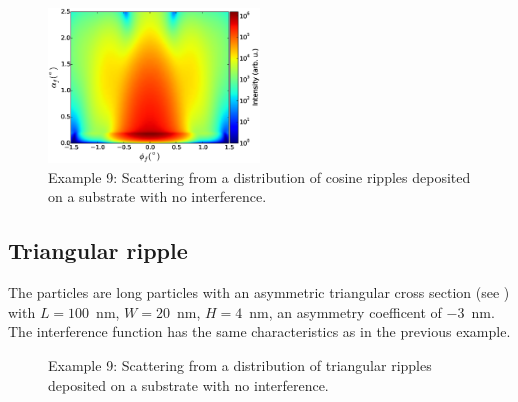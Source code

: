 \begin{figure}[H]
\begin{center}
\includegraphics[width=0.5\textwidth]{Figures/py-ex/figure_ex009CosRippleNoInterf.eps}
\end{center}
\caption{Example 9: Scattering from a distribution of cosine ripples deposited on a substrate with no interference.}
\label{fig:PythonEx9CosRipplenointerf}
\end{figure}

\subsection{Triangular ripple}
 The particles are long particles with an asymmetric triangular cross section (see ) with  $L=100$~nm, $W=20$~nm, $H=4$~nm, an asymmetry coefficent of $-3$~nm. The interference function has the same characteristics as in the previous example.

\begin{figure}[H]
\hfill
{}
\hfill
{}
\hfill
\caption{Example 9: Scattering from a distribution of triangular ripples deposited on a substrate with no interference.}
\label{fig:PythonEx9TriangRipple}
\end{figure}

